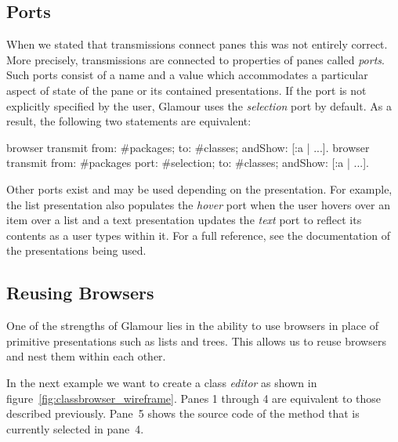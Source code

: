 \documentclass[a4paper,10pt,twoside]{book}
\begin{document}
\subsection{Ports}

When we stated that transmissions connect panes this was not entirely
correct. More precisely, transmissions are connected to properties of
panes called \emph{ports}. Such ports consist of a name and a value
which accommodates a particular aspect of state of the pane or its
contained presentations. If the port is not explicitly specified by
the user, Glamour uses the \emph{selection} port by default. As a
result, the following two statements are equivalent:

\begin{code}{}
browser transmit from: #packages; to: #classes; andShow: [:a | ...].
browser transmit from: #packages port: #selection; to: #classes; andShow: [:a | ...].
\end{code}


Other ports exist and may be used depending on the presentation. For
example, the list presentation also populates the \emph{hover} port
when the user hovers over an item over a list and a text presentation
updates the \emph{text} port to reflect its contents as a user types
within it. For a full reference, see the documentation of the
presentations being used.


\subsection{Reusing Browsers}
\label{sec:tutorial/reusing-browsers}

One of the strengths of Glamour lies in the ability to use browsers in
place of primitive presentations such as lists and trees. This allows
us to reuse browsers and nest them within each other.

In the next example we want to create a class \emph{editor} as shown
in figure~\ref{fig:classbrowser_wireframe}. Panes 1 through 4 are
equivalent to those described previously. Pane~5 shows the source code
of the method that is currently selected in pane~4.
\end{document}
